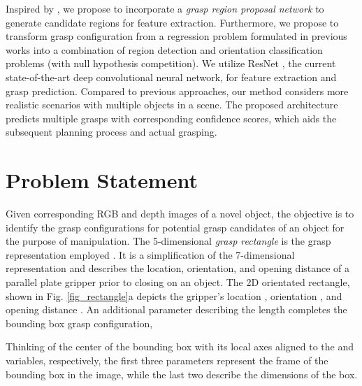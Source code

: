 \documentclass[letterpaper, 10 pt, journal, twoside]{IEEEtran}
\begin{document}
Inspired by \cite{ren2015faster}, we propose to incorporate a
\emph{grasp region proposal network} to generate candidate regions for feature
extraction.
Furthermore, we propose to transform grasp configuration from a
regression problem formulated in previous works \cite{redmon2015real,
kumra2016robotic} into a combination of region detection and orientation
classification problems (with null hypothesis competition). 
We utilize ResNet \cite{he2016deep}, the current state-of-the-art deep
convolutional neural network, for feature extraction and grasp
prediction.
Compared to previous approaches, our method considers more realistic
scenarios with multiple objects in a scene. The proposed architecture
predicts multiple grasps with corresponding confidence scores, which
aids the subsequent planning process and actual grasping.
 
\section{Problem Statement}
Given corresponding RGB and depth images of a novel object, the
objective is to identify the grasp configurations for potential grasp
candidates of an object for the purpose of manipulation.  
The 5-dimensional \emph{grasp rectangle} is the grasp representation employed
\cite{jiang2011efficient}.
It is a simplification of the 7-dimensional representation 
\cite{jiang2011efficient} and describes the location, orientation, and
opening distance of a parallel plate gripper prior to closing on an object. 
The 2D orientated rectangle, shown in Fig. \ref{fig_rectangle}a depicts
the gripper's location , orientation , and opening distance
.  An additional parameter describing the length  completes the
bounding box grasp configuration,



Thinking of the center of the bounding box with its local  axes
aligned to the  and  variables, respectively, the first three parameters
represent the  frame of the bounding box in the image, while the last
two describe the dimensions of the box.
\end{document}
